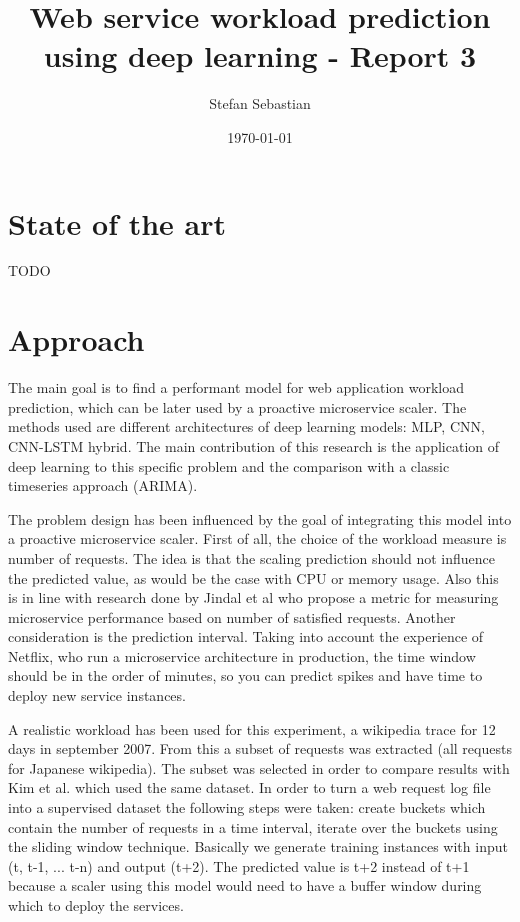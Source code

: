 \documentclass[12pt]{article}
\title{Web service workload prediction using deep learning - Report 3}
\date{\today}
\author{Stefan Sebastian}
\begin{document}
  \maketitle
  
  \newpage
  \tableofcontents
  \newpage 

  \section{State of the art}
  TODO 

  \section{Approach}
  The main goal is to find a performant model for web application 
  workload prediction, which can be later used by a proactive 
  microservice scaler. The methods used are different architectures
  of deep learning models: MLP, CNN, CNN-LSTM hybrid. The main 
  contribution of this research is the application of deep learning 
  to this specific problem and the comparison with a classic timeseries
  approach (ARIMA).

  The problem design has been influenced by the goal of integrating
  this model into a proactive microservice scaler. First of all,
  the choice of the workload measure is number of requests. The idea
  is that the scaling prediction should not influence the predicted 
  value, as would be the case with CPU or memory usage. Also this is 
  in line with research done by Jindal et al\cite{msc} who propose 
  a metric for measuring microservice performance based on number of 
  satisfied requests. Another consideration is the prediction interval.
  Taking into account the experience of Netflix\cite{scryer}, who run 
  a microservice architecture in production, the time window should be in 
  the order of minutes, so you can predict spikes and have time to deploy
  new service instances.

  A realistic workload has been used for this experiment, a wikipedia 
  trace for 12 days in september 2007. From this a subset of requests was 
  extracted (all requests for Japanese wikipedia). The subset was selected 
  in order to compare results with Kim et al.\cite{CloudInsight} which used 
  the same dataset. In order to turn a web request log file into a supervised 
  dataset the following steps were taken: create buckets which contain the 
  number of requests in a time interval, iterate over the buckets using 
  the sliding window technique\cite{sliding_window}. Basically we generate 
  training instances with input (t, t-1, ... t-n) and output (t+2). The 
  predicted value is t+2 instead of t+1 because a scaler using this model 
  would need to have a buffer window during which to deploy the services.
\end{document}
